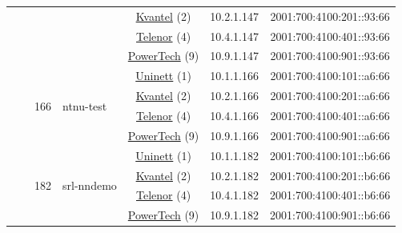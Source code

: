 \begin{small}
\begin{center}
\begin{longtable}{|c|c|c|c|c|c|c|c|}
  &  &  &  & \multicolumn{2}{|c|}{\tiny{\href{http://kvantel.no}{Kvantel} (2)}} & \tiny{10.2.1.147} & \tiny{2001:700:4100:201::93:66} \\* \cline{5-5}\cline{6-6}\cline{7-7}\cline{8-8}
  &  &  &  & \multicolumn{2}{|c|}{\tiny{\href{https://www.telenor.no}{Telenor} (4)}} & \tiny{10.4.1.147} & \tiny{2001:700:4100:401::93:66} \\* \cline{5-5}\cline{6-6}\cline{7-7}\cline{8-8}
  &  &  &  & \multicolumn{2}{|c|}{\tiny{\href{http://www.powertech.no}{PowerTech} (9)}} & \tiny{10.9.1.147} & \tiny{2001:700:4100:901::93:66} \\* \cline{3-3}\cline{4-4}\cline{5-5}\cline{6-6}\cline{7-7}\cline{8-8}
  &  & \multirow{4}{*}{\tiny{166}} & \multicolumn{1}{|l|}{\multirow{4}{*}{\tiny{ntnu-test}}} & \multicolumn{2}{|c|}{\tiny{\href{https://www.uninett.no}{Uninett} (1)}} & \tiny{10.1.1.166} & \tiny{2001:700:4100:101::a6:66} \\* \cline{5-5}\cline{6-6}\cline{7-7}\cline{8-8}
  &  &  &  & \multicolumn{2}{|c|}{\tiny{\href{http://kvantel.no}{Kvantel} (2)}} & \tiny{10.2.1.166} & \tiny{2001:700:4100:201::a6:66} \\* \cline{5-5}\cline{6-6}\cline{7-7}\cline{8-8}
  &  &  &  & \multicolumn{2}{|c|}{\tiny{\href{https://www.telenor.no}{Telenor} (4)}} & \tiny{10.4.1.166} & \tiny{2001:700:4100:401::a6:66} \\* \cline{5-5}\cline{6-6}\cline{7-7}\cline{8-8}
  &  &  &  & \multicolumn{2}{|c|}{\tiny{\href{http://www.powertech.no}{PowerTech} (9)}} & \tiny{10.9.1.166} & \tiny{2001:700:4100:901::a6:66} \\* \cline{3-3}\cline{4-4}\cline{5-5}\cline{6-6}\cline{7-7}\cline{8-8}
  &  & \multirow{4}{*}{\tiny{182}} & \multicolumn{1}{|l|}{\multirow{4}{*}{\tiny{srl-nndemo}}} & \multicolumn{2}{|c|}{\tiny{\href{https://www.uninett.no}{Uninett} (1)}} & \tiny{10.1.1.182} & \tiny{2001:700:4100:101::b6:66} \\* \cline{5-5}\cline{6-6}\cline{7-7}\cline{8-8}
  &  &  &  & \multicolumn{2}{|c|}{\tiny{\href{http://kvantel.no}{Kvantel} (2)}} & \tiny{10.2.1.182} & \tiny{2001:700:4100:201::b6:66} \\* \cline{5-5}\cline{6-6}\cline{7-7}\cline{8-8}
  &  &  &  & \multicolumn{2}{|c|}{\tiny{\href{https://www.telenor.no}{Telenor} (4)}} & \tiny{10.4.1.182} & \tiny{2001:700:4100:401::b6:66} \\* \cline{5-5}\cline{6-6}\cline{7-7}\cline{8-8}
  &  &  &  & \multicolumn{2}{|c|}{\tiny{\href{http://www.powertech.no}{PowerTech} (9)}} & \tiny{10.9.1.182} & \tiny{2001:700:4100:901::b6:66} \\ \hline

\end{longtable}
\end{center}
\end{small}
